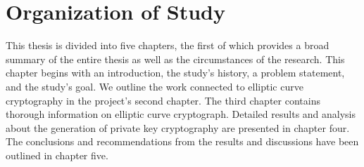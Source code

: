 \section{Organization of Study}  
This thesis is divided into five chapters, the first of which provides a broad summary of the entire thesis as well as the circumstances of the research. This chapter begins with an introduction, the study's history, a problem statement, and the study's goal. We outline the work connected to elliptic curve cryptography in the project's second chapter. The third chapter contains thorough information on elliptic curve cryptograph. Detailed results and analysis about the generation of private key cryptography are presented in chapter four. The conclusions and recommendations from the results and discussions have been outlined in chapter five.

